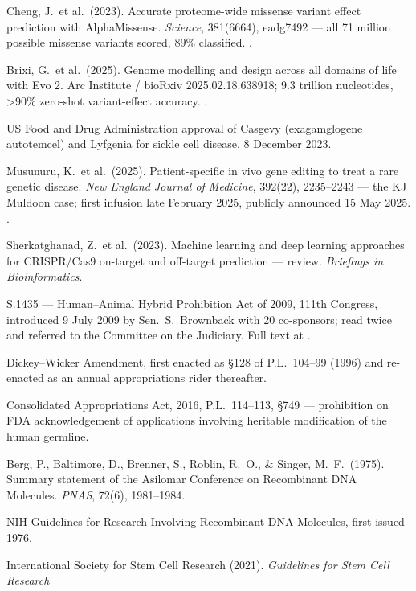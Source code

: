 \begin{srcnotes}
\item Cheng, J.\ et al.\ (2023). Accurate proteome-wide missense variant effect prediction with
AlphaMissense. \emph{Science}, 381(6664), eadg7492 --- all 71 million possible missense variants
scored, 89\% classified. .
\item Brixi, G.\ et al.\ (2025). Genome modelling and design across all domains of life with Evo 2.
Arc Institute / bioRxiv 2025.02.18.638918; 9.3 trillion nucleotides, {\textgreater}90\% zero-shot
variant-effect accuracy. .
\item US Food and Drug Administration approval of Casgevy (exagamglogene autotemcel) and Lyfgenia for
sickle cell disease, 8 December 2023.
\item Musunuru, K.\ et al.\ (2025). Patient-specific in vivo gene editing to treat a rare genetic
disease. \emph{New England Journal of Medicine}, 392(22), 2235--2243 --- the KJ Muldoon case; first
infusion late February 2025, publicly announced 15 May 2025.
.
\item Sherkatghanad, Z.\ et al.\ (2023). Machine learning and deep learning approaches for
CRISPR/Cas9 on-target and off-target prediction --- review. \emph{Briefings in Bioinformatics}.
\item S.1435 --- Human--Animal Hybrid Prohibition Act of 2009, 111th Congress, introduced
9 July 2009 by Sen.\ S.\ Brownback with 20 co-sponsors; read twice and referred to the Committee
on the Judiciary. Full text at .
\item Dickey--Wicker Amendment, first enacted as §128 of P.L.\ 104--99 (1996) and re-enacted as an
annual appropriations rider thereafter.
\item Consolidated Appropriations Act, 2016, P.L.\ 114--113, §749 --- prohibition on FDA
acknowledgement of applications involving heritable modification of the human germline.
\item Berg, P., Baltimore, D., Brenner, S., Roblin, R.\ O., \& Singer, M.\ F.\ (1975). Summary
statement of the Asilomar Conference on Recombinant DNA Molecules. \emph{PNAS}, 72(6), 1981--1984.
\item NIH Guidelines for Research Involving Recombinant DNA Molecules, first issued 1976.
\item International Society for Stem Cell Research (2021). \emph{Guidelines for Stem Cell Research
}
\end{srcnotes}
